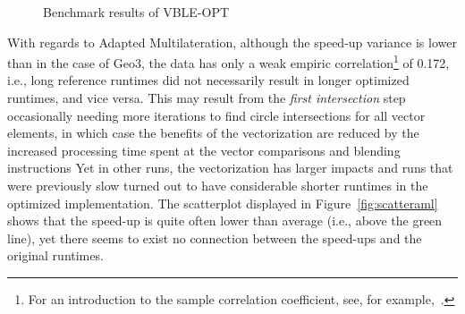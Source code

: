 \begin{figure}
\begin{center}
\end{center}
\caption{Benchmark results of VBLE-OPT}
\label{fig:vblescatterplots}
\end{figure}

With regards to Adapted Multilateration, although the speed-up variance is lower than in the case of Geo3, the data has only a weak empiric correlation\footnote{For an introduction to the sample correlation coefficient, see, for example,~\cite[p. 33ff]{ross2004statistics}.} of 0.172, i.e., long reference runtimes did not necessarily result in longer optimized runtimes, and vice versa. This may result from the \emph{first intersection} step occasionally needing more iterations to find circle intersections for all vector elements, in which case the benefits of the vectorization are reduced by the increased processing time spent at the vector comparisons and blending instructions Yet in other runs, the vectorization has larger impacts and runs that were previously slow turned out to have considerable shorter runtimes in the optimized implementation. The scatterplot displayed in Figure~\ref{fig:scatteraml} shows that the speed-up is quite often lower than average (i.e., above the green line), yet there seems to exist no connection between the speed-ups and the original runtimes.

